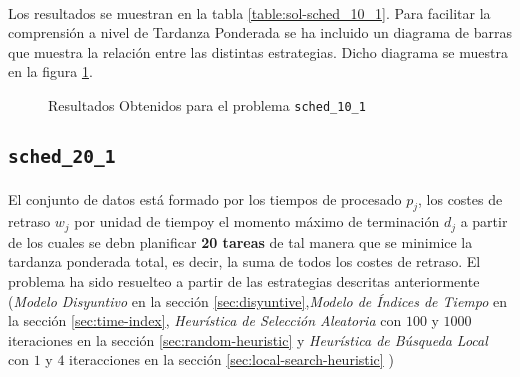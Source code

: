 \documentclass[spanish]{article}
\begin{document}
			\paragraph{}
			Los resultados se muestran en la tabla \ref{table:sol-sched_10_1}. Para facilitar la comprensión a nivel de Tardanza Ponderada se ha incluido un diagrama de barras que muestra la relación entre las distintas estrategias. Dicho diagrama se muestra en la figura \ref{plot:sol-sched_10_1}.

			\begin{figure}
				\begin{center}
				\end{center}
				\caption{Resultados Obtenidos para el problema \texttt{sched\_10\_1}}
				\label{plot:sol-sched_10_1}
			\end{figure}

		\subsection{\texttt{sched\_20\_1}}

			\paragraph{}
			El conjunto de datos está formado por los tiempos de procesado $p_j$, los costes de retraso $w_j$ por unidad de tiempoy el momento máximo de terminación $d_j$ a partir de los cuales se debn planificar \textbf{20 tareas} de tal manera que se minimice la tardanza ponderada total, es decir, la suma de todos los costes de retraso. El problema ha sido resuelteo a partir de las estrategias descritas anteriormente (\emph{Modelo Disyuntivo} en la sección \ref{sec:disyuntive},\emph{Modelo de Índices de Tiempo} en la sección \ref{sec:time-index}, \emph{Heurística de Selección Aleatoria} con $100$ y $1000$ iteraciones en la sección \ref{sec:random-heuristic} y \emph{Heurística de Búsqueda Local} con $1$ y $4$ iteracciones en la sección \ref{sec:local-search-heuristic} )
\end{document}
